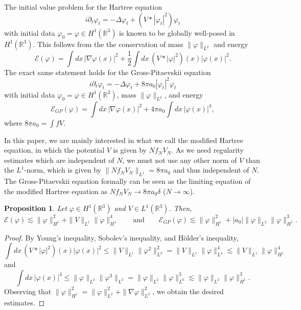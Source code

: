 \documentclass[11pt,a4paper,draft,DIV11]{scrartcl}	%
\newtheorem{prp}[thm]{Proposition}
\newcommand{\R}{\mathds{R}}
\newcommand{\Rbb}{\mathbb{R}}		%
\newcommand{\norm}[1]{\lVert#1\rVert}	%
\begin{document}
The initial value problem for the Hartree equation
\[
  i \partial_t \varphi_t = - \Delta \varphi_t + (V * |\varphi_t|^2)
  \varphi_t
\]
with initial data $\varphi_0 = \varphi \in H^1(\R^3)$ is known to be
globally well-posed in $H^1(\R^3)$. This follows from the the conservation
of mass $\| \varphi \|_{L^2}$ and energy
\[
  \mathcal{E}(\varphi) = \int dx \, |\nabla \varphi(x)|^2 + \frac{1}{2} \int
  dx \, (V * |\varphi|^2)(x) |\varphi(x)|^2.
\]
The exact same statement holds for the
Gross-Pitaevskii equation
\[
  i \partial_t \varphi_t = - \Delta \varphi_t + 8 \pi a_0 |\varphi_t|^2
  \varphi_t
\]
with initial data $\varphi_0 = \varphi \in H^1(\Rbb^3)$, mass $\| \varphi \|_{L^2}$, and
energy
\[
  \mathcal{E}_{GP}(\varphi) = \int dx \, |\nabla \varphi(x)|^2 + 4 \pi a_0
  \int dx \, |\varphi(x)|^4,
\]
where $8 \pi a_0 = \int f V$.

In this paper, we are mainly interested in what we call the modified Hartree equation, in which the potential $V$ is given by $N f_N V_N$. As we need regularity estimates which are independent of $N$, we must not use any other norm of $V$ than the $L^1$-norm, which is given by $\norm{N f_N V_N}_{L^1} = 8 \pi a_0$ and thus independent of $N$. The Gross-Pitaevskii equation formally can be seen as the limiting equation of the modified Hartree equation as $N f_N V_N \to 8 \pi a_0 \delta$ ($N \to \infty$).


\begin{prp} \label{p:energy}
  Let $\varphi \in H^1(\R^3)$ and $V \in L^1(\R^3)$. Then,
  \[
    \mathcal{E}(\varphi) \apprle \| \varphi \|_{H^1}^2 + \| V \|_{L^1} \|
    \varphi \|_{H^1}^4 \qquad \text{and} \qquad \mathcal{E}_{GP}(\varphi)
    \apprle \| \varphi \|_{H^1}^2 + |a_0| \| \varphi \|_{L^2} \| \varphi
    \|_{H^1}^3.
  \]
\end{prp}


\begin{proof}
  By Young's inequality, Sobolev's inequality, and H\"older's inequality, 
  \[
    \int dx \, (V * |\varphi|^2)(x) |\varphi(x)|^2 \le \| V \|_{L^1} \|
    \varphi^2 \|_{L^2}^2 = \| V \|_{L^1} \| \varphi \|_{L^4}^4 \apprle \| V
    \|_{L^1} \| \varphi \|_{H^1}^4
  \]
  and
  \[
    \int dx \, |\varphi(x)|^4 \le \| \varphi \|_{L^2} \| \varphi^3 \|_{L^2} =
    \| \varphi \|_{L^2} \| \varphi \|_{L^6}^3 \apprle \| \varphi \|_{L^2} \|
    \varphi \|_{H^1}^3.
  \]
  Observing that $\| \varphi \|_{H^1}^2 = \| \varphi \|_{L^2}^2 + \| \nabla
  \varphi \|_{L^2}^2$, we obtain the desired estimates.
\end{proof}
\end{document}

